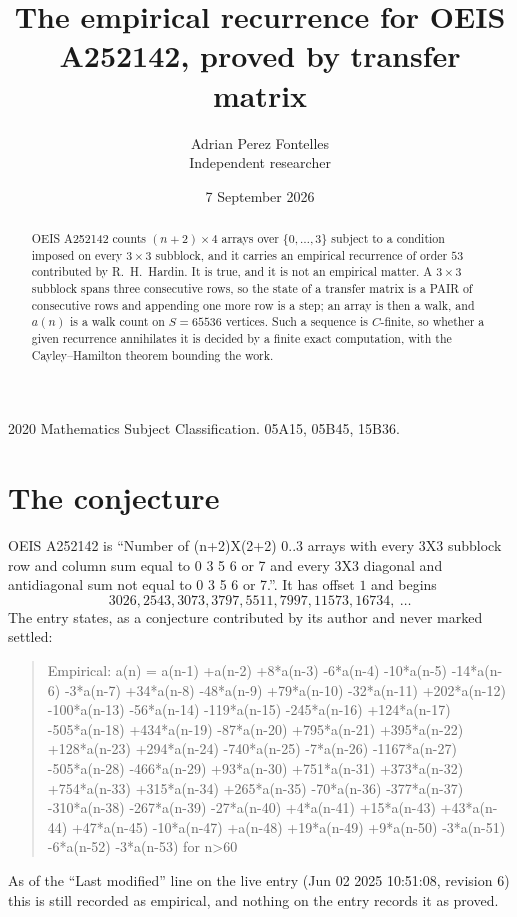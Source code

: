 \documentclass[11pt,a4paper]{article}
\title{The empirical recurrence for OEIS A252142, proved by transfer matrix}
\author{Adrian Perez Fontelles\\ \small Independent researcher}
\date{7 September 2026}
\theoremstyle{plain}
\theoremstyle{definition}
\begin{document}
\maketitle

\begin{abstract}
OEIS A252142 counts $(n+2)\times4$ arrays over $\{0,\dots,3\}$ subject to a condition imposed on
every $3\times3$ subblock, and it carries an empirical recurrence of order $53$
contributed by R.~H.~Hardin. It is true, and it is not an empirical matter. A $3\times3$
subblock spans three consecutive rows, so the state of a transfer matrix is a PAIR of
consecutive rows and appending one more row is a step; an array is then a walk, and
$a(n)$ is a walk count on $S=65536$ vertices. Such a sequence is $C$-finite, so whether a given
recurrence annihilates it is decided by a finite exact computation, with the Cayley--Hamilton
theorem bounding the work.
\end{abstract}

\noindent\small 2020 Mathematics Subject Classification. 05A15, 05B45, 15B36.\normalsize

\section{The conjecture}

OEIS A252142 is ``Number of (n+2)X(2+2) 0..3 arrays with every 3X3 subblock row and column sum equal to 0 3 5 6 or 7 and every 3X3 diagonal and antidiagonal sum not equal to 0 3 5 6 or 7.''. It has offset $1$ and begins
\[
3026, 2543, 3073, 3797, 5511, 7997, 11573, 16734,\ \dots
\]
The entry states, as a conjecture contributed by its author and never marked settled:
\begin{quote}
Empirical: a(n) = a(n-1) +a(n-2) +8*a(n-3) -6*a(n-4) -10*a(n-5) -14*a(n-6) -3*a(n-7) +34*a(n-8) -48*a(n-9) +79*a(n-10) -32*a(n-11) +202*a(n-12) -100*a(n-13) -56*a(n-14) -119*a(n-15) -245*a(n-16) +124*a(n-17) -505*a(n-18) +434*a(n-19) -87*a(n-20) +795*a(n-21) +395*a(n-22) +128*a(n-23) +294*a(n-24) -740*a(n-25) -7*a(n-26) -1167*a(n-27) -505*a(n-28) -466*a(n-29) +93*a(n-30) +751*a(n-31) +373*a(n-32) +754*a(n-33) +315*a(n-34) +265*a(n-35) -70*a(n-36) -377*a(n-37) -310*a(n-38) -267*a(n-39) -27*a(n-40) +4*a(n-41) +15*a(n-43) +43*a(n-44) +47*a(n-45) -10*a(n-47) +a(n-48) +19*a(n-49) +9*a(n-50) -3*a(n-51) -6*a(n-52) -3*a(n-53) for n>60
\end{quote}
As of the ``Last modified'' line on the live entry (Jun 02 2025 10:51:08, revision 6) this is still
recorded as empirical, and nothing on the entry records it as proved.
\end{document}
